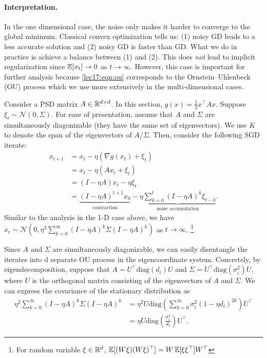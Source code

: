 \paragraph{Interpretation.} In the one dimensional case, the noise only makes it harder to converge to the global minimum. Classical convex optimization tells us: (1) noisy GD leads to a less accurate solution and (2) noisy GD is faster than GD. What we do in practice is achieve a balance between (1) and (2). This does \textit{not} lead to implicit regularization since $\operatorname*{\mathbb{E}}[x_t] \rightarrow 0$ as $t \rightarrow \infty$. However, this case is important for further analysis because \eqref{lec17:eqn:ou} corresponds to the Ornstein–Uhlenbeck (OU) process which we use more extensively in the multi-dimensional cases.

Consider a PSD matrix $A \in \mathbb R^{d\times d}$. In this section, $g(x) = \frac{1}{2}x^\top A x$. Suppose $\xi_t \sim \mathcal{N}(0, \Sigma)$. For ease of presentation, assume that $A$ and $\Sigma$ are simultaneously diagonizable (they have the same set of eigenvectors). We use $K$ to denote the span of the eigenvectors of $A$/$\Sigma$. Then, consider the following SGD iterate:
\begin{align}
x_{t+1} &= x_t - \eta(\nabla g(x_{t}) + \xi_t)\\
&= x_t - \eta(Ax_t + \xi_t)\\
&= (I- \eta A)x_t - \eta\xi_t\\
&= \underbrace{(I- \eta A)^{t+1} x_0}_{\text{contraction}} - \underbrace{\eta\sum_{k=0}^{t} (I- \eta A)^{k}\xi_{t-k}}_{\text{noise accumulation}}.
\end{align}
Similar to the analysis in the 1-D case above, we have $x_t \sim \mathcal{N}(0, \eta^2\sum_{k=0}^{\infty} (I- \eta A)^{k}\Sigma (I- \eta A)^{k})$ as $t \rightarrow \infty$. \footnote{For random variable $\xi\in \mathbb R^d$, $\operatorname*{\mathbb{E}}[(W\xi)(W\xi)^\top] = W\operatorname*{\mathbb{E}}[\xi\xi^\top]W^\top$}

Since $A$ and $\Sigma$ are simultaneously diagonizable, we can easily disentangle the iterates into d separate OU process in the eigencoordinate system. Concretely, by eigendecomposition, suppose that $A = U^\top \text{diag}(d_i) U$ and $\Sigma = U^\top \text{diag}(\sigma_i^2) U$, where $U$ is the orthogonal matrix consisting of the eigenvectors of $A$ and $\Sigma$. We can express the covariance of the stationary distribution as
\begin{align}
\eta^2\sum_{k=0}^{\infty} (I- \eta A)^{k}\Sigma (I- \eta A)^{k} &= \eta^2 U\text{diag}\left(\sum_{k=0}^{\infty}\sigma_i^2(1-\eta d_i)^{2k}\right)U^\top\\
&= \eta U\text{diag}\left(\frac{\sigma_i^2}{d_i}\right)U^\top.
\end{align}
